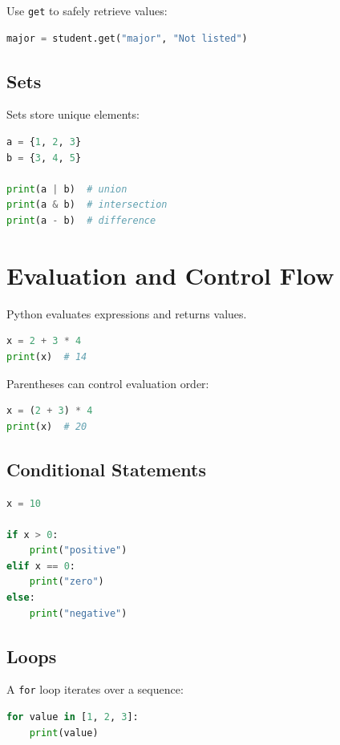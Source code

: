 \documentclass[12pt,oneside]{book}
\numberwithin{equation}{section}
\theoremstyle{definition}
\theoremstyle{plain}
\theoremstyle{remark}
\begin{document}
Use \texttt{get} to safely retrieve values:
\begin{lstlisting}[language=Python]
major = student.get("major", "Not listed")
\end{lstlisting}

\subsection{Sets}

Sets store unique elements:
\begin{lstlisting}[language=Python]
a = {1, 2, 3}
b = {3, 4, 5}

print(a | b)  # union
print(a & b)  # intersection
print(a - b)  # difference
\end{lstlisting}

\section{Evaluation and Control Flow}

Python evaluates expressions and returns values.

\begin{lstlisting}[language=Python]
x = 2 + 3 * 4
print(x)  # 14
\end{lstlisting}

Parentheses can control evaluation order:
\begin{lstlisting}[language=Python]
x = (2 + 3) * 4
print(x)  # 20
\end{lstlisting}

\subsection{Conditional Statements}

\begin{lstlisting}[language=Python]
x = 10

if x > 0:
    print("positive")
elif x == 0:
    print("zero")
else:
    print("negative")
\end{lstlisting}

\subsection{Loops}

A \texttt{for} loop iterates over a sequence:
\begin{lstlisting}[language=Python]
for value in [1, 2, 3]:
    print(value)
\end{lstlisting}
\end{document}
